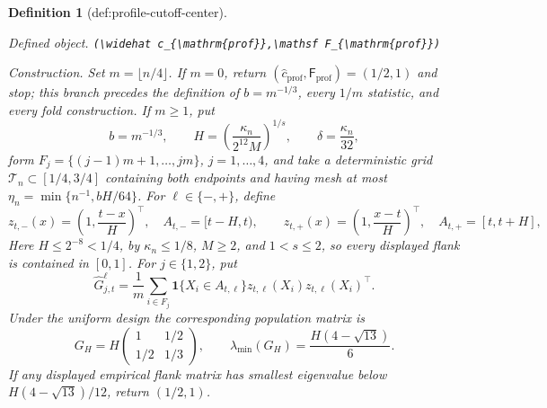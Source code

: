 \documentclass{article}
\newtheorem{definition}{Definition}
\begin{document}
\begin{definition}[def:profile-cutoff-center]\label{def:profile-cutoff-center}
\par\smallskip\noindent\emph{Defined object.} \texttt{(\textbackslash{}\allowbreak{}widehat c\_\allowbreak{}\{\textbackslash{}\allowbreak{}mathrm\{prof\}\allowbreak{}\}\allowbreak{},\allowbreak{}\textbackslash{}\allowbreak{}mathsf F\_\allowbreak{}\{\textbackslash{}\allowbreak{}mathrm\{prof\}\allowbreak{}\}\allowbreak{})}
\par\smallskip\noindent\emph{Construction.} Set \(m=\lfloor n/4\rfloor\).  If \(m=0\), return
\((\widehat c_{\mathrm{prof}},\mathsf F_{\mathrm{prof}})=(1/2,1)\)
and stop; this branch precedes the definition of \(b=m^{-1/3}\), every
\(1/m\) statistic, and every fold construction.  If \(m\ge1\), put
\[
 b=m^{-1/3},\qquad
 H=\left(\frac{\kappa_n}{2^{12}M}\right)^{1/s},\qquad
 \delta=\frac{\kappa_n}{32},
\]
form \(F_j=\{(j-1)m+1,\ldots,jm\}\), \(j=1,\ldots,4\), and take a
deterministic grid \(\mathcal T_n\subset[1/4,3/4]\) containing both
endpoints and having mesh at most
\(\eta_n=\min\{n^{-1},bH/64\}\).  For \(\ell\in\{-,+\}\), define
\[
 z_{t,-}(x)=\left(1,\frac{t-x}{H}\right)^\top,
 \quad A_{t,-}=[t-H,t),\qquad
 z_{t,+}(x)=\left(1,\frac{x-t}{H}\right)^\top,
 \quad A_{t,+}=[t,t+H],
\]
Here \(H\le2^{-8}<1/4\), by \(\kappa_n\le1/8\), \(M\ge2\), and
\(1<s\le2\), so every displayed flank is contained in \([0,1]\).
For \(j\in\{1,2\}\), put
\[
 \widehat G_{j,t}^{\ell}
 =\frac1m\sum_{i\in F_j}
   \mathbf 1\{X_i\in A_{t,\ell}\}
   z_{t,\ell}(X_i)z_{t,\ell}(X_i)^\top.
\]
Under the uniform design the corresponding population matrix is
\[
 G_H=H\begin{pmatrix}1&1/2\\[2pt]1/2&1/3\end{pmatrix},
 \qquad
 \lambda_{\min}(G_H)=\frac{H(4-\sqrt{13})}{6}.
\]
If any displayed empirical flank matrix has smallest eigenvalue below
\(H(4-\sqrt{13})/12\), return \((1/2,1)\).


\end{definition}
\end{document}
